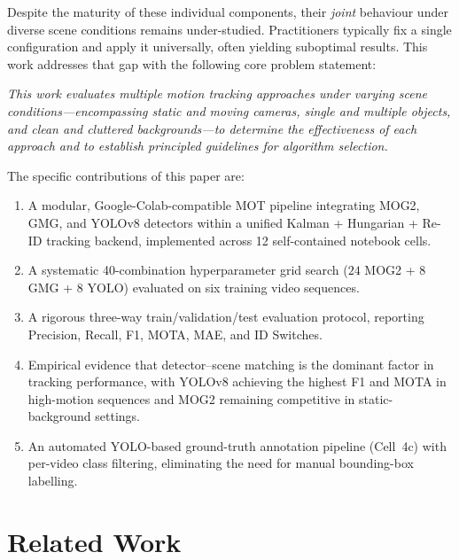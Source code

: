 \documentclass[10pt, conference, compsocconf]{IEEEtran}
\begin{document}
Despite the maturity of these individual components, their
\emph{joint} behaviour under diverse scene conditions remains
under-studied. Practitioners typically fix a single configuration and
apply it universally, often yielding suboptimal results. This work
addresses that gap with the following core problem statement:

\textit{This work evaluates multiple motion tracking approaches under
varying scene conditions---encompassing static and moving cameras,
single and multiple objects, and clean and cluttered
backgrounds---to determine the effectiveness of each approach and to
establish principled guidelines for algorithm selection.}

The specific contributions of this paper are:
\begin{enumerate}
  \item A modular, Google-Colab-compatible MOT pipeline integrating
        MOG2, GMG, and YOLOv8 detectors within a unified Kalman +
        Hungarian + Re-ID tracking backend, implemented across
        12 self-contained notebook cells.
  \item A systematic 40-combination hyperparameter grid search
        ($24$ MOG2 + $8$ GMG + $8$ YOLO) evaluated on six training
        video sequences.
  \item A rigorous three-way train/validation/test evaluation
        protocol, reporting Precision, Recall, F1, MOTA, MAE, and
        ID Switches.
  \item Empirical evidence that detector--scene matching is the
        dominant factor in tracking performance, with YOLOv8
        achieving the highest F1 and MOTA in high-motion sequences
        and MOG2 remaining competitive in static-background settings.
  \item An automated YOLO-based ground-truth annotation pipeline
        (Cell~4c) with per-video class filtering, eliminating the
        need for manual bounding-box labelling.
\end{enumerate}

\section{Related Work}
\end{document}
